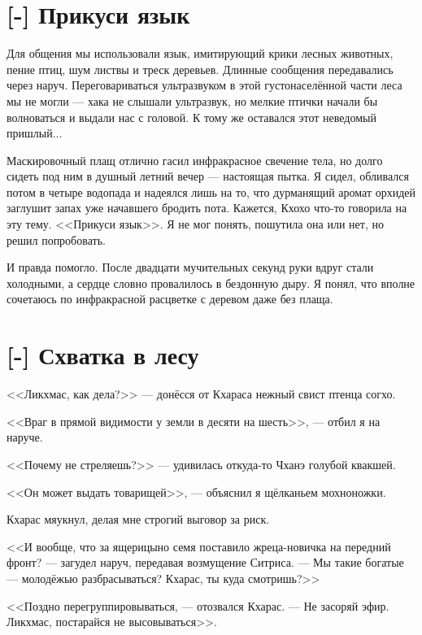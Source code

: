 \section{[-] Прикуси язык}

\textspace

Для общения мы использовали язык, имитирующий крики лесных животных, пение птиц, шум листвы и треск деревьев.
Длинные сообщения передавались через наруч.
Переговариваться ультразвуком в этой густонаселённой части леса мы не могли --- хака не слышали ультразвук, но мелкие птички начали бы волноваться и выдали нас с головой.
К тому же оставался этот неведомый пришлый...

Маскировочный плащ отлично гасил инфракрасное свечение тела, но долго сидеть под ним в душный летний вечер --- настоящая пытка.
Я сидел, обливался потом в четыре водопада и надеялся лишь на то, что дурманящий аромат орхидей заглушит запах уже начавшего бродить пота.
Кажется, Кхохо что-то говорила на эту тему.
<<Прикуси язык>>.
Я не мог понять, пошутила она или нет, но решил попробовать.

И правда помогло.
После двадцати мучительных секунд руки вдруг стали холодными, а сердце словно провалилось в бездонную дыру.
Я понял, что вполне сочетаюсь по инфракрасной расцветке с деревом даже без плаща.

\section{[-] Схватка в лесу}

\textspace

<<Ликхмас, как дела?>> --- донёсся от Кхараса нежный свист птенца согхо.

<<Враг в прямой видимости у земли в десяти на шесть>>, --- отбил я на наруче.

<<Почему не стреляешь?>> --- удивилась откуда-то Чханэ голубой квакшей.

<<Он может выдать товарищей>>, --- объяснил я щёлканьем мохноножки.

Кхарас мяукнул, делая мне строгий выговор за риск.

<<И вообще, что за ящерицыно семя поставило жреца-новичка на передний фронт? --- загудел наруч, передавая возмущение Ситриса.
--- Мы такие богатые --- молодёжью разбрасываться?
Кхарас, ты куда смотришь?>>

<<Поздно перегруппировываться, --- отозвался Кхарас.
--- Не засоряй эфир.
Ликхмас, постарайся не высовываться>>.

